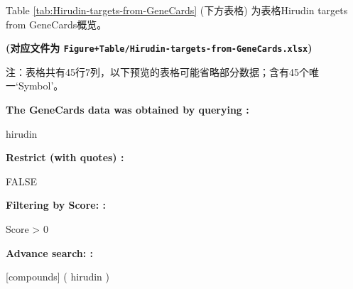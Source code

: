 \documentclass[
]{article}
\begin{document}
Table \ref{tab:Hirudin-targets-from-GeneCards} (下方表格) 为表格Hirudin targets from GeneCards概览。

\textbf{(对应文件为 \texttt{Figure+Table/Hirudin-targets-from-GeneCards.xlsx})}

\begin{center}\begin{tcolorbox}[colback=gray!10, colframe=gray!50, width=0.9\linewidth, arc=1mm, boxrule=0.5pt]注：表格共有45行7列，以下预览的表格可能省略部分数据；含有45个唯一`Symbol'。
\end{tcolorbox}
\end{center}\begin{center}\begin{tcolorbox}[colback=gray!10, colframe=gray!50, width=0.9\linewidth, arc=1mm, boxrule=0.5pt]
\textbf{
The GeneCards data was obtained by querying
:}

\vspace{0.5em}

    hirudin

\vspace{2em}


\textbf{
Restrict (with quotes)
:}

\vspace{0.5em}

    FALSE

\vspace{2em}


\textbf{
Filtering by Score:
:}

\vspace{0.5em}

    Score > 0

\vspace{2em}


\textbf{
Advance search:
:}

\vspace{0.5em}

    [compounds] ( hirudin )

\vspace{2em}
\end{tcolorbox}
\end{center}
\end{document}
